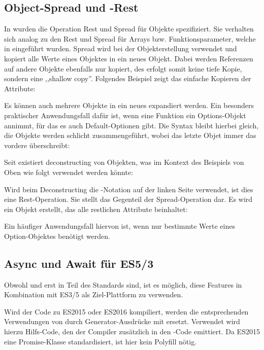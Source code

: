 \subsection{Object-Spread und -Rest}
In  wurden die Operation Rest und Spread für Objekte spezifiziert. Sie verhalten sich analog zu den Rest und Spread für Arrays bzw. Funktionsparameter, welche in  eingeführt wurden. Spread wird bei der Objekterstellung verwendet und kopiert alle Werte eines Objektes in ein neues Objekt. Dabei werden Referenzen auf andere Objekte ebenfalls nur kopiert, des erfolgt somit keine tiefe Kopie, sondern eine ,,shallow copy''. Folgendes Beispiel zeigt das einfache Kopieren der Attribute:


Es können auch mehrere Objekte in ein neues expandiert werden. Ein besonders praktischer Anwendungsfall dafür ist, wenn eine Funktion ein Options-Objekt annimmt, für das es auch Default-Optionen gibt. Die Syntax bleibt hierbei gleich, die Objekte werden schlicht zusammengeführt, wobei das letzte Objet immer das vordere überschreibt:


Seit  existiert deconstructing von Objekten, was im Kontext des Beispiels von Oben wie folgt verwendet werden könnte:


Wird beim Deconstructing die -Notation auf der linken Seite verwendet, ist dies eine Rest-Operation. Sie stellt das Gegenteil der Spread-Operation dar. Es wird ein Objekt erstellt, das alle restlichen Attribute beinhaltet:


Ein häufiger Anwendungsfall hiervon ist, wenn nur bestimmte Werte eines Option-Objektes benötigt werden.

\subsection{Async und Await für ES5/3}
Obwohl \tsasync und \tsawait erst in  Teil des Standards sind, ist es möglich, diese Features in Kombination mit ES3/5 als Ziel-Plattform zu verwenden.

Wird der Code zu ES2015 oder ES2016 kompiliert, werden die entsprechenden Verwendungen von \tsawait durch Generator-Ausdrücke mit \tsyield ersetzt. Verwendet wird hierzu Hilfs-Code, den der Compiler zusätzlich in den \js-Code emittiert. Da ES2015 eine Promise-Klasse standardisiert, ist hier kein Polyfill nötig.

